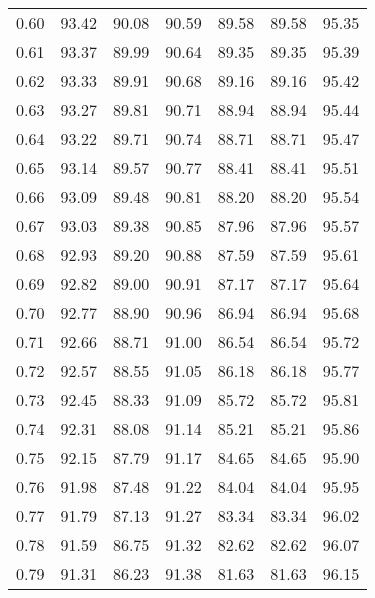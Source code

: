 \begin{tabular}{|c|c|c|c|c|c|c|}
      0.60 &     93.42 &     90.08 &      90.59 &   89.58 &      89.58 &         95.35 \\
      0.61 &     93.37 &     89.99 &      90.64 &   89.35 &      89.35 &         95.39 \\
      0.62 &     93.33 &     89.91 &      90.68 &   89.16 &      89.16 &         95.42 \\
      0.63 &     93.27 &     89.81 &      90.71 &   88.94 &      88.94 &         95.44 \\
      0.64 &     93.22 &     89.71 &      90.74 &   88.71 &      88.71 &         95.47 \\
      0.65 &     93.14 &     89.57 &      90.77 &   88.41 &      88.41 &         95.51 \\
      0.66 &     93.09 &     89.48 &      90.81 &   88.20 &      88.20 &         95.54 \\
      0.67 &     93.03 &     89.38 &      90.85 &   87.96 &      87.96 &         95.57 \\
      0.68 &     92.93 &     89.20 &      90.88 &   87.59 &      87.59 &         95.61 \\
      0.69 &     92.82 &     89.00 &      90.91 &   87.17 &      87.17 &         95.64 \\
      0.70 &     92.77 &     88.90 &      90.96 &   86.94 &      86.94 &         95.68 \\
      0.71 &     92.66 &     88.71 &      91.00 &   86.54 &      86.54 &         95.72 \\
      0.72 &     92.57 &     88.55 &      91.05 &   86.18 &      86.18 &         95.77 \\
      0.73 &     92.45 &     88.33 &      91.09 &   85.72 &      85.72 &         95.81 \\
      0.74 &     92.31 &     88.08 &      91.14 &   85.21 &      85.21 &         95.86 \\
      0.75 &     92.15 &     87.79 &      91.17 &   84.65 &      84.65 &         95.90 \\
      0.76 &     91.98 &     87.48 &      91.22 &   84.04 &      84.04 &         95.95 \\
      0.77 &     91.79 &     87.13 &      91.27 &   83.34 &      83.34 &         96.02 \\
      0.78 &     91.59 &     86.75 &      91.32 &   82.62 &      82.62 &         96.07 \\
      0.79 &     91.31 &     86.23 &      91.38 &   81.63 &      81.63 &         96.15 \\

\end{tabular}
